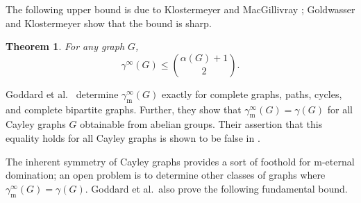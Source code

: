 \documentclass[12pt]{article}%
\newtheorem{theorem}{Theorem}[section]
\providecommand{\boksie}{\ensuremath{\mathbin{\raisebox{0.3mm}{$\scriptstyle\square$}}}}
\begin{document}


The following upper bound is due to Klostermeyer and MacGillivray \cite{KM};
Goldwasser and Klostermeyer \cite{GK} show that the bound is sharp.

\begin{theorem}
\label{ThmKM}\emph{\cite{KM}\hspace{0.1in}}For any graph $G$,%
\[
\gamma^{\infty}(G)\leq\binom{\alpha(G)+1}{2}.
\]

\end{theorem}

Goddard et al.~\cite{GHH} determine $\gamma_{\mathrm{m}}^{\infty}(G)$ exactly
for complete graphs, paths, cycles, and complete bipartite graphs. Further,
they show that $\gamma_{\mathrm{m}}^{\infty}(G)=\gamma(G)$ for all Cayley
graphs $G$ obtainable from abelian groups. Their assertion that this equality
holds for all Cayley graphs is shown to be false in \cite{BdSL}.

The inherent symmetry of Cayley graphs provides a sort of foothold for
$\mathrm{m}$-eternal domination; an open problem is to determine other classes
of graphs where $\gamma_{\mathrm{m}}^{\infty}(G)=\gamma(G)$. Goddard et
al.~also prove the following fundamental bound.
\end{document}
